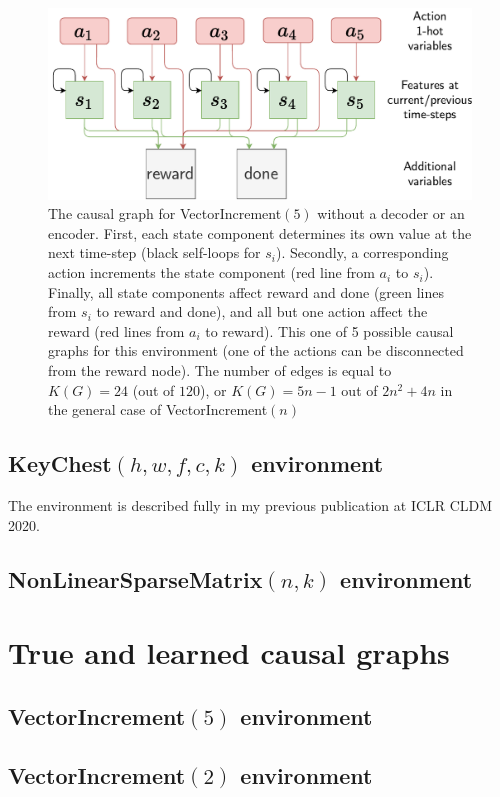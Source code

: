 \documentclass[a4paper,11pt,oneside]{report}
\begin{document}
\begin{figure}[h]
    \centering
    \includegraphics[width=0.7\linewidth]{diagrams/ve5_nodec}
    \caption{The causal graph for VectorIncrement$(5)$ without a decoder or an encoder. First, each state component determines its own value at the next time-step (black self-loops for $s_i$). Secondly, a corresponding action increments the state component (red line from $a_i$ to $s_i$). Finally, all state components affect reward and done (green lines from $s_i$ to reward and done), and all but one action affect the reward (red lines from $a_i$ to reward). This one of 5 possible causal graphs for this environment (one of the actions can be disconnected from the reward node). The number of edges is equal to $K(G)=24$ (out of $120$), or $K(G)=5n-1$ out of $2n^2+4n$ in the general case of VectorIncrement$(n)$}
    \label{fig:ve5nodec}
\end{figure}


\subsection{KeyChest$(h,w,f,c,k)$ environment}
The environment is described fully in my previous publication\cite{Volodin2020} at ICLR CLDM 2020.

\subsection{NonLinearSparseMatrix$(n,k)$ environment}

\section{True and learned causal graphs}
\subsection{VectorIncrement$(5)$ environment}
\subsection{VectorIncrement$(2)$ environment}
\end{document}
